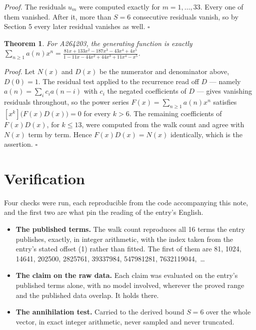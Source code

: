 \documentclass[11pt]{article}
\newtheorem{theorem}{Theorem}
\theoremstyle{definition}
\begin{document}
{\itshape Proof.} The residuals $u_m$ were computed exactly for $m = 1,\dots,33$. Every one of them vanished. After it, more than $S = 6$ consecutive residuals vanish, so by Section 5 every later residual vanishes as well. $\square$

\begin{theorem} For A264203, the generating function is exactly $\sum_{n\ge 1} a(n)x^n = \frac{81x + 133x^{2} - 187x^{3} - 43x^{4} + 4x^{5}}{1 - 11x - 44x^{2} + 44x^{3} + 11x^{4} - x^{5}}$.\end{theorem}

{\itshape Proof.} Let $N(x)$ and $D(x)$ be the numerator and denominator above, $D(0)=1$. The residual test applied to the recurrence read off $D$ --- namely $a(n) = \sum_i c_i a(n-i)$ with $c_i$ the negated coefficients of $D$ --- gives vanishing residuals throughout, so the power series $F(x)=\sum_{n\ge 1}a(n)x^n$ satisfies $[x^k]\bigl(F(x)D(x)\bigr) = 0$ for every $k > 6$. The remaining coefficients of $F(x)D(x)$, for $k \le 13$, were computed from the walk count and agree with $N(x)$ term by term. Hence $F(x)D(x) = N(x)$ identically, which is the assertion. $\square$

\section{Verification}

Four checks were run, each reproducible from the code accompanying this note, and the first two are what pin the reading of the entry's English.

\begin{itemize}

\item {\bfseries The published terms.} The walk count reproduces all 16 terms the entry publishes, exactly, in integer arithmetic, with the index taken from the entry's stated offset (1) rather than fitted. The first of them are 81, 1024, 14641, 202500, 2825761, 39337984, 547981281, 7632119044,~\dots

\item {\bfseries The claim on the raw data.} Each claim was evaluated on the entry's published terms alone, with no model involved, wherever the proved range and the published data overlap. It holds there.

\item {\bfseries The annihilation test.} Carried to the derived bound $S = 6$ over the whole vector, in exact integer arithmetic, never sampled and never truncated.

\end{itemize}
\end{document}
